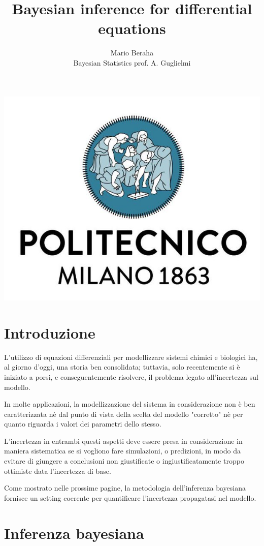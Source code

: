 \documentclass[12pt,a4paper]{article}
\begin{document}
\linespread{2}
\title{Bayesian inference for differential equations}%
\author{Mario Beraha\\ %
	Bayesian Statistics   prof. A. Guglielmi} 

\maketitle

\begin{center}
	\includegraphics[width=.5\linewidth]{../grafici/logo_polimi.jpg}
\end{center}

\newpage

\section{Introduzione}
L'utilizzo di equazioni differenziali per modellizzare sistemi chimici e biologici ha, al giorno d'oggi, una storia ben consolidata; tuttavia, solo recentemente si è iniziato a porsi, e conseguentemente risolvere, il problema legato all'incertezza sul modello.

In molte applicazioni, la modellizzazione del sistema in considerazione non è ben caratterizzata nè dal punto di vista della scelta del modello "corretto" nè per quanto riguarda i valori dei parametri dello stesso.

L'incertezza in entrambi questi aspetti deve essere presa in considerazione in maniera sistematica se si vogliono fare simulazioni, o predizioni, in modo da evitare di giungere a conclusioni non giustificate o ingiustificatamente troppo ottimiste data l'incertezza di base.

Come mostrato nelle prossime pagine, la metodologia dell'inferenza bayesiana fornisce un setting coerente per quantificare l'incertezza propagatasi nel modello.

\section{Inferenza bayesiana}
\end{document}
